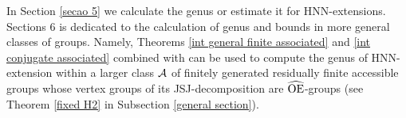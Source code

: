 \documentclass[a4paper,12pt]{article}
\newcommand{\A}{{\cal A}}
\newcommand{\Oe}{\rm \widehat{OE}}
\def\aut {{\rm Aut}}
\def\out {{\rm Out}}
\def\hnn {{\rm HNN}}
\begin{document}
In Section \ref{secao 5} we calculate the genus or estimate it for HNN-extensions. Sections 6 is dedicated to the calculation of genus and bounds in more general classes of groups.  Namely, Theorems \ref{int general finite associated} and \ref{int conjugate associated} combined with  \cite[Theorem 1.1]{BPZ}  can be used to compute  the genus of HNN-extension within a larger class $\A$ of finitely generated residually finite accessible groups whose vertex groups of its JSJ-decomposition are $\Oe$-groups  (see Theorem \ref{fixed H2} in Subsection  \ref{general section}).  






\end{document}
